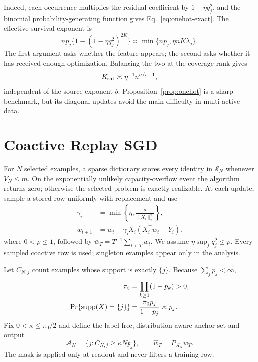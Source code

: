 \documentclass[letterpaper]{article}
\newcommand{\cA}{\mathcal A}
\newcommand{\cS}{\mathcal S}
\begin{document}
Indeed, each occurrence multiplies the residual coefficient by
$1-\eta q_j^2$, and the binomial probability-generating function gives
Eq.~\eqref{eq:onehot-exact}. The effective survival exponent is
\[
np_j\{1-(1-\eta q_j^2)^{2K}\}
\asymp \min\{np_j,\eta nK\lambda_j\}.
\]
The first argument asks whether the feature appears; the second asks whether it
has received enough optimization. Balancing the two at the coverage rank gives
\begin{equation}
K_{\rm sat}\asymp\eta^{-1}n^{a/s-1},
\label{eq:ksat-onehot}
\end{equation}
independent of the source exponent $b$. Proposition~\ref{prop:onehot} is a sharp
benchmark, but its diagonal updates avoid the main difficulty in multi-active
data.

\section{Coactive Replay SGD}

For $N$ selected examples, a sparse dictionary stores every identity in
$\cS_N$ whenever $V_N\le m$. On the exponentially unlikely capacity-overflow
event the algorithm returns zero; otherwise the selected problem is exactly
realizable. At each update, sample a stored row uniformly with replacement and
use
\begin{equation}
\begin{aligned}
\gamma_i&=\min\left\{\eta,\frac{\rho}{\|X_i\|_2^2}\right\},\\
w_{t+1}&=w_t-\gamma_iX_i(X_i^\top w_t-Y_i).
\end{aligned}
\label{eq:clippedsgd}
\end{equation}
where $0<\rho\le1$, followed by
$\bar w_T=T^{-1}\sum_{t<T}w_t$. We assume
$\eta\sup_jq_j^2\le\rho$. Every sampled coactive row is used; singleton examples
appear only in the analysis.

Let $C_{N,j}$ count examples whose support is exactly $\{j\}$. Because
$\sum_jp_j<\infty$,
\begin{equation}
\begin{aligned}
\pi_0&=\prod_{k\ge1}(1-p_k)>0,\\
\Pr\{{\rm supp}(X)=\{j\}\}
&=\frac{\pi_0p_j}{1-p_j}\asymp p_j.
\end{aligned}
\label{eq:singleton-probability}
\end{equation}
Fix $0<\kappa\le\pi_0/2$ and define the label-free, distribution-aware anchor
set and output
\begin{equation}
\cA_N=\{j:C_{N,j}\ge\kappa Np_j\},
\qquad
\widehat w_T=P_{\cA_N}\bar w_T.
\label{eq:anchor}
\end{equation}
The mask is applied only at readout and never filters a training row.
\end{document}
